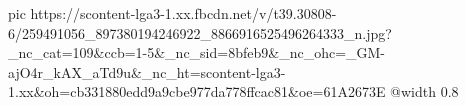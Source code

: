  
 
 
 
 

\ifcmt
  pic https://scontent-lga3-1.xx.fbcdn.net/v/t39.30808-6/259491056_897380194246922_8866916525496264333_n.jpg?_nc_cat=109&ccb=1-5&_nc_sid=8bfeb9&_nc_ohc=_GM-ajO4r_kAX_aTd9u&_nc_ht=scontent-lga3-1.xx&oh=cb331880edd9a9cbe977da778ffcac81&oe=61A2673E
  @width 0.8
\fi
